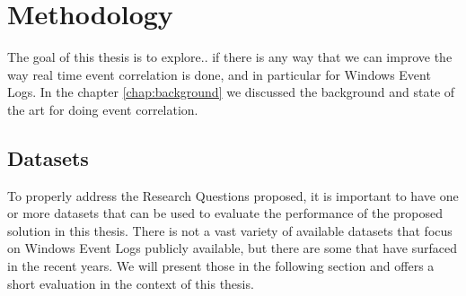 \chapter{Methodology}
\label{chap:methodology}

The goal of this thesis is to explore.. if there is any way that we can improve the way real time event correlation is done, and in particular for Windows Event Logs.
In the chapter \ref{chap:background} we discussed the background and state of the art for doing event correlation.

\section{Datasets}
\label{sec:datasets}
To properly address the Research Questions proposed, it is important to have one or more datasets that can be used to evaluate the performance of the proposed solution in this thesis.
There is not a vast variety of available datasets that focus on Windows Event Logs publicly available, but there are some that have surfaced in the recent years. We will present those in the following section and offers a short evaluation in the context of this thesis.

